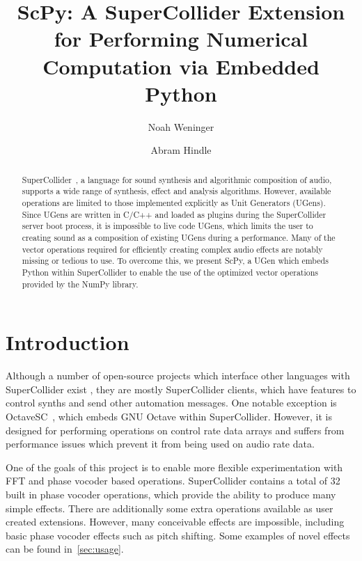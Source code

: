 \documentclass{article}
\begin{document}
\title{ScPy: A SuperCollider Extension for Performing Numerical Computation via Embedded Python}

\author{Noah Weninger \and Abram Hindle}

\maketitle

\begin{abstract}

    SuperCollider~\cite{wilson2011supercollider}, a language for sound synthesis and algorithmic
    composition of audio, supports a wide range of synthesis, effect and analysis algorithms.
    However, available operations are limited to those implemented explicitly as Unit Generators
    (UGens). Since UGens are written in C/C++ and loaded as plugins during the SuperCollider server
    boot process, it is impossible to live code UGens, which limits the user to creating sound as a
    composition of existing UGens during a performance.  Many of the vector operations required for
    efficiently creating complex audio effects are notably missing or tedious to use. To overcome
    this, we present ScPy, a UGen which embeds Python within SuperCollider to enable the use of the
    optimized vector operations provided by the NumPy library.

\end{abstract}

\section{Introduction}\label{sec:introduction}

Although a number of open-source projects which interface other languages with SuperCollider exist
\cite{systemsinterfacingwithsc,magnusson2011ixi,orlarey2009faust}, they are mostly SuperCollider
clients, which have features to control synths and send other automation messages.  One notable
exception is OctaveSC~\cite{octavesc}, which embeds GNU Octave within SuperCollider.  However, it
is designed for performing operations on control rate data arrays and suffers from performance
issues which prevent it from being used on audio rate data.

One of the goals of this project is to enable more flexible experimentation with FFT and phase
vocoder based operations. SuperCollider contains a total of 32 built in phase vocoder operations,
which provide the ability to produce many simple effects. There are additionally some extra
operations available as user created extensions. However, many conceivable effects are impossible,
including basic phase vocoder effects such as pitch shifting. Some examples of novel effects can
be found in~\autoref{sec:usage}.
\end{document}

